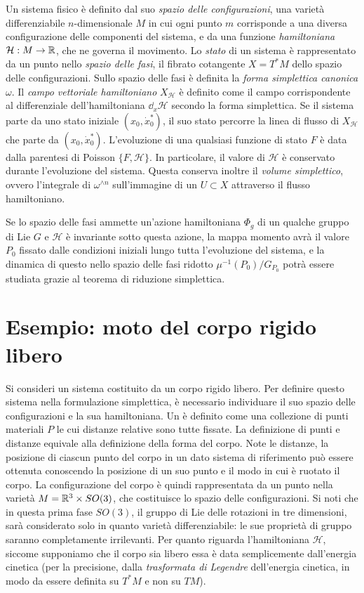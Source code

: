 Un sistema fisico è definito dal suo \emph{spazio delle configurazioni}, una varietà differenziabile $n$-dimensionale $M$ in cui ogni punto $m$ corrisponde a una diversa configurazione delle componenti del sistema, e da una funzione \emph{hamiltoniana} $\mathcal{H}: M\to \mathbb{R}$, che ne governa il movimento. Lo \emph{stato} di un sistema è rappresentato da un punto nello \emph{spazio delle fasi}, il fibrato cotangente $X = T^* M$ dello spazio delle configurazioni. Sullo spazio delle fasi è definita la \emph{forma simplettica canonica} $\omega$. Il \emph{campo vettoriale hamiltoniano} $X_{\mathcal{H}}$ è definito come il campo corrispondente al differenziale dell'hamiltoniana $\dd_{x}{\mathcal{H}}$ secondo la forma simplettica. Se il sistema parte da uno stato iniziale $(x_0, \dot{x}^*_0)$, il suo stato percorre la linea di flusso di $X_{\mathcal{H}}$ che parte da $(x_0, \dot{x}^*_0)$. L'evoluzione di una qualsiasi funzione di stato $F$ è data dalla parentesi di Poisson $\{F, \mathcal{H}\}$. In particolare, il valore di $\mathcal{H}$ è conservato durante l'evoluzione del sistema. Questa conserva inoltre il \emph{volume simplettico}, ovvero l'integrale di $\omega^{\wedge n}$ sull'immagine di un $U \subset X$ attraverso il flusso hamiltoniano.

Se lo spazio delle fasi ammette un'azione hamiltoniana $\Phi_g$ di un qualche gruppo di Lie $G$ e $\mathcal{H}$ è invariante sotto questa azione, la mappa momento avrà il valore $P_0$ fissato dalle condizioni iniziali lungo tutta l'evoluzione del sistema, e la dinamica di questo nello spazio delle fasi ridotto $\mu^{-1}(P_0)/G_{P_0}$ potrà essere studiata grazie al teorema di riduzione simplettica. 

\section{Esempio: moto del corpo rigido libero}
Si consideri un sistema costituito da un corpo rigido libero. Per definire questo sistema nella formulazione simplettica, è necessario individuare il suo spazio delle configurazioni e la sua hamiltoniana. Un  è definito come una collezione di punti materiali $P$ le cui distanze relative sono tutte fissate. La definizione di punti e distanze equivale alla definizione della forma del corpo. Note le distanze, la posizione di ciascun punto del corpo in un dato sistema di riferimento può essere ottenuta conoscendo la posizione di un suo punto e il modo in cui è ruotato il corpo. La configurazione del corpo è quindi rappresentata da un punto nella varietà $M = \mathbb{R}^3 \times SO(3)$, che costituisce lo spazio delle configurazioni. Si noti che in questa prima fase $SO(3)$, il gruppo di Lie delle rotazioni in tre dimensioni, sarà considerato solo in quanto varietà differenziabile: le sue proprietà di gruppo saranno completamente irrilevanti. Per quanto riguarda l'hamiltoniana $\mathcal{H}$, siccome supponiamo che il corpo sia libero essa è data semplicemente dall'energia cinetica (per la precisione, dalla \emph{trasformata di Legendre} dell'energia cinetica, in modo da essere definita su $T^*M$ e non su $TM$). 

